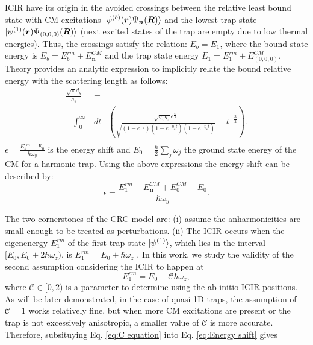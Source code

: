 \documentclass[aps,pre,twocolumn,superscriptaddress,showpacs]{revtex4-1}
\newcommand{\bfeq}[1]{{\boldsymbol{#1}}}
\begin{document}
ICIR have its origin in the avoided crossings between the relative least bound state with CM excitations $\ket{\psi^{(b)}(\bfeq{r}) \Psi_{\bfeq{n}} (\bfeq{R})}$ and the lowest trap state $\ket{\psi^{(1)}(\bfeq{r}) \Psi_{(0,0,0)} (\bfeq{R})}$ (next excited states of the trap are empty due to low thermal energies).  Thus, the crossings satisfy the relation: $E_b = E_1$, where the bound state energy is $E_b = E^{rm}_b + E^{CM}_{\bfeq{n}}$ and the trap state energy $E_1 = E^{rm}_1 + E^{CM}_{(0,0,0)}$. Theory provides an analytic expression to implicitly relate the bound relative energy with the scattering length as follows:
\begin{eqnarray}
\frac{\sqrt{\pi} d_y}{a_s} &=& \nonumber \\
 - \int^\infty_0 &dt& \left( \frac{\sqrt{\eta_x \eta_z} e^{\frac{\epsilon t}{2}}}{\sqrt{(1 - e^{-t}) (1 - e^{-\eta_x t}) (1 - e^{-\eta_z t})} } - t^{-\frac{3}{2}}\right). \nonumber \\
\label{eq:ascE}
\end{eqnarray}
$\epsilon = \frac{E^{rm}_b - E_0}{\hbar \omega_y}$ is the energy shift and $E_0 = \frac{\hbar}{2}\sum_j \omega_j $ the ground state energy of the CM for a harmonic trap. Using the above expressions the energy shift can be described by:
\begin{equation}
\epsilon = \frac{E^{rm}_1 - E^{CM}_{\bfeq{n}} + E^{CM}_0 - E_0}{\hbar \omega_y}.
\label{eq:Energy shift}
\end{equation}
	
The two cornerstones of the CRC model are: (i) assume the anharmonicities are small enough to be treated as perturbations. (ii) The ICIR occurs when the eigenenergy $E^{rm}_1$ of the first trap state $\ket{\psi^{(1)}}$, which lies in the interval $[E_0, E_0 + 2\hbar \omega_z)$, is $E^{rm}_1 = E_0 + \hbar \omega_z$ \cite{PhysRevLett.109.073201}. In this work, we study 
the validity of the second assumption considering the ICIR to happen at
\begin{equation}
E^{rm}_1 = E_0 + \mathcal{C} \hbar \omega_z,
\label{eq:C equation}
\end{equation}
where $\mathcal{C} \in [0, 2)$ is a parameter to determine using the ab initio ICIR positions. As will be later demonstrated, in the case of quasi 1D traps, the assumption of $\mathcal{C}=1$ works relatively fine, but when more CM excitations are present or the trap is not excessively anisotropic, a smaller value of $\mathcal{C}$ is more accurate. Therefore, subsituying Eq. \eqref{eq:C equation} into Eq. \eqref{eq:Energy shift} gives
\end{document}
